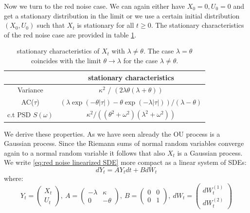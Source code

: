 \documentclass[%
thesis=student,%
coverpage=false,%
titlepage=false,%
headmarks=true, %
english,%
font=libertine, %
math=newpxtx, %
BCOR=5mm,%
coverBCOR=11mm%
]{tumbook}
\begin{document}
Now we turn to the red noise case. We can again either have $X_{0} = 0, U_{0} = 0$ and get a stationary distribution in the limit or we use a certain initial distribution $(X_{0},U_{0})$ such that $X_{t}$ is stationary for all $t \geq 0$. The stationary characteristics of the red noise case are provided in table \ref{tab:red_noise_stat_char}.

\begin{table}[h!]
\centering
\begin{tabular}{|c|c|}
\hline
& stationary characteristics\\
\hline
Variance & $\kappa^2$ / $(2\lambda\theta(\lambda + \theta))$\\
AC($\tau$) & $(\lambda\exp(-\theta\lvert\tau\rvert)-\theta\exp(-\lambda\lvert\tau\rvert))/(\lambda - \theta)$\\
c.t PSD $S(\omega)$ & $\kappa^2/((\theta^2 + \omega^2)(\lambda^2 + \omega^2))$\\
\hline
\end{tabular}
\caption{stationary characteristics of $X_{t}$ with $\lambda \neq \theta$. The case $\lambda = \theta$ coincides with the limit $\theta \rightarrow \lambda$ for the case $\lambda \neq \theta$.}
\label{tab:red_noise_stat_char}
\end{table}

We derive these properties. As we have seen already the OU process is a Gaussian process. Since the Riemann sums of normal random variables converge again to a normal random variable it follows that also $X_{t}$ is a Gaussian process. We write \eqref{eq:red noise linearized SDE} more compact as a linear system of SDEs: 
\[
dY_{t} = AY_{t}dt + BdW_{t}
\]
where:
\begin{equation}
        Y_{t} = 
    \begin{pmatrix}
       X_{t} \\
       U_{t}
    \end{pmatrix}
    ,\ A = 
    \begin{pmatrix}
        -\lambda &  \kappa \\
        0        & -\theta
    \end{pmatrix}
    ,\ B = 
    \begin{pmatrix}
        0 & 0 \\
        0 & 1
    \end{pmatrix}
    ,\ dW_{t} = 
    \begin{pmatrix}
        dW_{t}^{(1)} \\
        dW_{t}^{(2)}
    \end{pmatrix}
    \label{summarized 2D SDE}
\end{equation}
\end{document}
